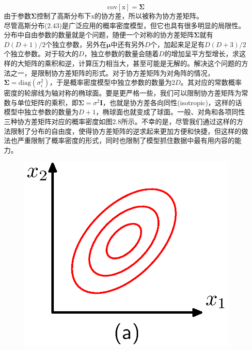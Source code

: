 \documentclass[b5paper]{book}
\numberwithin{equation}{chapter}
\newcommand {\bx} {\boldsymbol{\mathrm{x}}}
\newcommand {\bfMu} {\boldsymbol{\mu}}
\newcommand {\bfSigma} {\boldsymbol{\Sigma}}
\begin{document}
{\begin{equation}
		\mathrm{cov}[\bx]=\bfSigma
	\end{equation}
	由于参数$\bfSigma$控制了高斯分布下$\bx$的协方差，所以被称为协方差矩阵。\\
	\indent 尽管高斯分布(2.43)是广泛应用的概率密度模型，但它也具有很多明显的局限性。分布中自由参数的数量就是个问题，随便一个对称的协方差矩阵$\bfSigma$就有$D(D+1)/2$个独立参数，另外在$\bfMu$中还有另外$D$个，加起来足足有$D(D+3)/2$个独立参数。对于较大的$D$，独立参数的数量会随着$D$的增加呈平方型增长，求这样的大矩阵的乘积和逆，计算压力相当大，甚至可能是无解的。解决这个问题的方法之一，是限制协方差矩阵的形式。对于协方差矩阵为对角阵的情况，$\bfSigma=\mathrm{diag}(\sigma_i^2)$，于是概率密度模型中独立参数的数量为$2D$。其对应的常数概率密度的轮廓线为轴对称的椭球面。要是更严格一些，我们可以限制协方差矩阵为常数与单位矩阵的乘积，即$\bfSigma=\sigma^2 \mathbf{I}$，也就是协方差各向同性(isotropic)，这样的话模型中独立参数的数量为$D+1$，椭球面也就变成了球面。一般、对角和各项同性三种协方差矩阵对应的概率密度如图2.8所示。不幸的是，尽管我们通过这样的方法限制了分布的自由度，使得协方差矩阵的逆求起来更加方便和快捷，但这样的做法也严重限制了概率密度的形式，同时也限制了模型抓住数据中最有用内容的能力。
	\begin{figure}[ht]
	\centering
		\begin{minipage}[t]{0.3\linewidth}
		\centering
		\includegraphics[scale=0.8]{Images/2-8a.png}
		\label{fig:2-8a}
		\end{minipage}
		\begin{minipage}[t]{0.3\linewidth}

\end{minipage}
\end{figure}}
\end{document}
